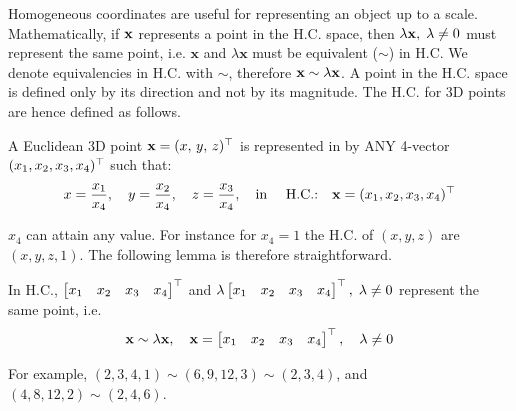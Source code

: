 \documentclass[a4paper]{article}
\begin{document}
Homogeneous coordinates are useful for representing an object up to a scale. Mathematically, if $\textbf{\textup{x}}$ represents a point in the H.C. space, then $\lambda \textbf{\textup{x}}, \; \lambda \neq 0$ must represent the same point, i.e. $\textbf{x}$ and $\lambda\textbf{x}$ must be equivalent ($\sim$) in H.C. We denote equivalencies in H.C. with $\sim$, therefore $\textbf{x} \sim \lambda \textbf{x}$. A point in the H.C. space is defined only by its direction and not by its magnitude. The H.C. for 3D points are hence defined as follows.
\begin{definition}
A Euclidean 3D point $\textbf{x} = (x,\, y,\, z)^{\top}$ is represented in  by ANY 4-vector $(x_1,x_2,x_3,x_4)^{\top}$ such that:
\begin{equation}
    x = \frac{x_1}{x_4}, \quad y = \frac{x_2}{x_4}, \quad z = \frac{x_3}{x_4}, \quad \textup{in \quad H.C.:} \quad
    \textbf{\textup{x}} = (x_1, x_2, x_3, x_4)^{\top}
    \label{eq:ec_to_hc}
\end{equation}
\end{definition}
$x_4$ can attain any value. For instance for $x_4=1$ the H.C. of $(x,y,z)$ are $(x,y,z,1)$. The following lemma is therefore straightforward.
\begin{lemma}
In H.C., $\begin{bmatrix}x_1 & x_2 & x_3 & x_4\end{bmatrix}^{\top}$ and $\lambda \begin{bmatrix}x_1 & x_2 & x_3 & x_4\end{bmatrix}^{\top},\; \lambda \neq 0$  represent the same point, i.e.
\begin{equation}
    \textbf{\textup{x}} \sim \lambda \textbf{\textup{x}}, \quad \textbf{\textup{x}} = \begin{bmatrix}x_1 & x_2 & x_3 & x_4\end{bmatrix}^{\top}, \quad \lambda \neq 0
\end{equation}
\label{lem:hc_equiv}
\end{lemma}
For example, $(2,3,4,1) \sim (6,9,12,3) \sim (2,3,4)$, and $(4,8,12,2)\sim (2,4,6)$. 
\end{document}
